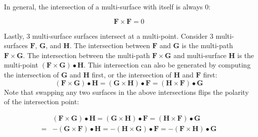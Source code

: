 In general, the intersection of a multi-surface with itself is always \(0\):

\begin{thm}
\[\mathbf{F} \times \mathbf{F} = 0\]
\end{thm}


Lastly, 3 multi-surface surfaces intersect at a multi-point. Consider \(3\) multi-surfaces \(\mathbf{F}\), \(\mathbf{G}\), and \(\mathbf{H}\). The intersection between \(\mathbf{F}\) and \(\mathbf{G}\) is the multi-path \(\mathbf{F} \times \mathbf{G}\). The intersection between the multi-path \(\mathbf{F} \times \mathbf{G}\) and multi-surface \(\mathbf{H}\) is the multi-point \((\mathbf{F} \times \mathbf{G}) \bullet \mathbf{H}\). This intersection can also be generated by computing the intersection of \(\mathbf{G}\) and \(\mathbf{H}\) first, or the intersection of \(\mathbf{H}\) and \(\mathbf{F}\) first:
\[(\mathbf{F} \times \mathbf{G}) \bullet \mathbf{H} = (\mathbf{G} \times \mathbf{H}) \bullet \mathbf{F} = (\mathbf{H} \times \mathbf{F}) \bullet \mathbf{G}\]
Note that swapping any two surfaces in the above intersections flips the polarity of the intersection point:
\begin{thm}
\begin{align*}
& (\mathbf{F} \times \mathbf{G}) \bullet \mathbf{H} = (\mathbf{G} \times \mathbf{H}) \bullet \mathbf{F} = (\mathbf{H} \times \mathbf{F}) \bullet \mathbf{G} \\ 
= & -(\mathbf{G} \times \mathbf{F}) \bullet \mathbf{H} = -(\mathbf{H} \times \mathbf{G}) \bullet \mathbf{F} = -(\mathbf{F} \times \mathbf{H}) \bullet \mathbf{G}
\end{align*}
\end{thm}

